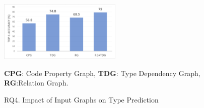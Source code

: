 \begin{figure}[t]%
\begin{center}
\includegraphics[width=2.3in]{figures/sensi-graphs-type-2}
\vspace{-8pt}
\caption{RQ4. Impact of Input Graphs on Type Prediction}
\label{graph-type-result}
{\bf CPG}: Code Property Graph, {\bf TDG}: Type Dependency Graph, {\bf RG}:Relation Graph.
\end{center}
\end{figure}



